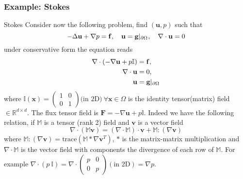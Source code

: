 \subsubsection{Example: Stokes}
  \begin{remark}{Stokes}
    Consider now the following problem, find $(\mathbf{u},p)$ such that
    \begin{equation}
      \label{notes:eq:45}
      -\Delta \mathbf{u} + \nabla p  = \mathbf{f},\quad \mathbf{u} = \mathbf{g}|_{\partial {\ensuremath{\Omega^{}}}},\quad \nabla \cdot \mathbf{u} = 0
    \end{equation}
    under conservative form the equation reads
    \begin{eqnarray}
      \nabla \cdot ( -\nabla \mathbf{u} + p \mathbb{I} ) &= \mathbf{f},\label{notes:eq:8}\\
      \nabla \cdot \mathbf{u} &= 0,\label{notes:eq:10}\\
      \mathbf{u} &= \mathbf{g}|_{\partial {\ensuremath{\Omega^{}}}}\label{notes:eq:11}
    \end{eqnarray}
    where $\mathbb{I}(\mathbf{x})=
    \begin{pmatrix}
      1 & 0\\
      0 & 1
    \end{pmatrix}\text{(in 2D)}
    \ \forall \mathbf{x} \in \Omega$ is the identity tensor(matrix) field $\in
    \mathbb{R}^{d\times d}$. The flux tensor field is
    $\mathbf{F}=-\nabla \mathbf{u} + p\mathbb{I}$. Indeed we have  the
    following relation, if $\mathbb{M}$ is a tensor (rank 2) field and $\mathbf{v}$ is a vector field
    \begin{equation}
      \label{notes:eq:12}
      \nabla \cdot ( \mathbb{M} \mathbf{v} ) = (\nabla \cdot \mathbb{M}) \cdot \mathbf{v} + \mathbb{M} \colon (\nabla \mathbf{v})
    \end{equation}
    where $\mathbb{M} \colon (\nabla \mathbf{v}) =
    \mathrm{trace}(\mathbb{M}*\nabla \mathbf{v}^T)$, $*$ is the
    matrix-matrix multiplication and $\nabla \cdot \mathbb{M}$ is the
    vector field with components the divergence of each row of
    $\mathbb{M}$. For example $\nabla \cdot (p\ \mathbb{I})=\nabla \cdot
    \begin{pmatrix}
      p & 0 \\
      0 & p
    \end{pmatrix}(\text{in 2D}) =  \nabla p$.
  \end{remark}


